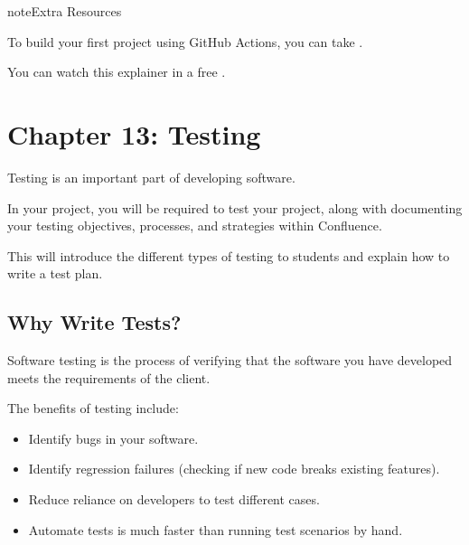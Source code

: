 \documentclass[letterpaper,10pt,english]{jupyterBook}
\begin{document}
\begin{sphinxadmonition}{note}{Extra Resources}

\sphinxAtStartPar
To build your first project using GitHub Actions, you can take
.

\sphinxAtStartPar
You can watch this explainer in a free .
\end{sphinxadmonition}


\chapter{Chapter 13: Testing}
\label{\detokenize{chapter_13/testing:chapter-13-testing}}\label{\detokenize{chapter_13/testing::doc}}
\sphinxAtStartPar
Testing is an important part of developing software.

\sphinxAtStartPar
In your project, you will be required to test your project, along with
documenting your testing objectives, processes, and strategies within
Confluence.

\sphinxAtStartPar
This will introduce the different types of testing to students and
explain how to write a test plan.


\section{Why Write Tests?}
\label{\detokenize{chapter_13/testing:why-write-tests}}
\sphinxAtStartPar
Software testing is the process of verifying that the software you have
developed meets the requirements of the client.

\sphinxAtStartPar
The benefits of testing include:
\begin{itemize}
\item {} 
\sphinxAtStartPar
Identify bugs in your software.

\item {} 
\sphinxAtStartPar
Identify regression failures (checking if new code breaks existing
features).

\item {} 
\sphinxAtStartPar
Reduce reliance on developers to test different cases.

\item {} 
\sphinxAtStartPar
Automate tests is much faster than running test scenarios by hand.

\end{itemize}
\end{document}
